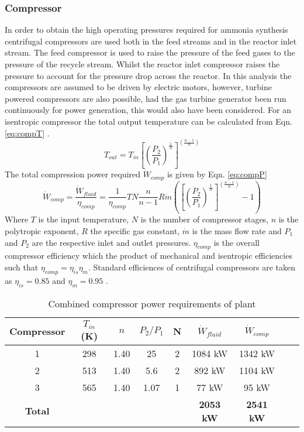 \subsubsection{Compressor}
In order to obtain the high operating pressures required for ammonia synthesis centrifugal compressors are used both in the feed streams and in the reactor inlet stream. The feed compressor is used to raise the pressure of the feed gases to the pressure of the recycle stream. Whilst the reactor inlet compressor raises the pressure to account for the pressure drop across the reactor. In this analysis the compressors are assumed to be driven by electric motors, however, turbine powered compressors are also possible, had the gas turbine generator been run continuously for power generation, this would also have been considered. 
For an isentropic compressor the total output temperature can be calculated from Eqn. \ref{eq:compT} \cite{Morgan2013}.
\begin{equation}
\label{eq:compT}
T_{out} = T_{in}\left[ \left( \frac{P_2}{P_1}\right)^{\frac{1}{N}} \right]^{\left( \frac{n-1}{n}\right)} 
\end{equation}
The total 
compression power required $\dot W_{comp}$ is given by Eqn. \ref{eq:compP}
\begin{equation}
\label{eq:compP}
\dot W_{comp} = \frac{ \dot W_{fluid}}{\eta_{comp}} = \frac{1}{\eta_{comp}} TN\frac{n}{n-1}R\dot m \left( \left[ \left( \frac{P_2}{P_1}\right)^{\frac{1}{N}} \right]^{\left( \frac{n-1}{n}\right)} - 1 \right)
\end{equation}
Where $T$ is the input temperature, $N$ is the number of compressor stages, $n$ is the polytropic exponent, $R$ the specific gas constant, $\dot m$ is the mass flow rate and $P_1$ and $P_2$ are the respective inlet and outlet pressures. $\eta_{comp}$ is the overall compressor efficiency which the product of mechanical and isentropic efficiencies such that $\eta_{comp} =\eta_{is}\eta_{m}$. Standard efficiences of centrifugal compressors are taken as $\eta_{is} = 0.85$ and $\eta_m = 0.95$ \cite{Penkuhn2017}. 

\begin{table}[!htbp]
	\begin{center}
		\label{tab:power}
		\caption{Combined compressor power requirements of plant}
		
		\begin{tabular}{|c|c|c|c|c|c|c|c|c|}
			\hline
			Compressor& $T_{in}$ (K)& $n$ & $P_2/P_1$ & N & $\dot{W}_{fluid}$ & $\dot{W}_{comp}$\\ \hline
			1      &298          & 1.40                & 25 &2 & 1084 kW & 1342 kW\\ \hline
			2& 513 &  1.40 & 5.6  & 2& 892 kW & 1104 kW\\ \hline
			3      & 565         & 1.40                 & 1.07 &1 &77 kW & 95 kW \\ \hline
				\textbf{Total}      &          &                  &  &  & \textbf{2053 kW}&\textbf{2541 kW}  \\ \hline
		\end{tabular}
		
	\end{center}
\end{table}

